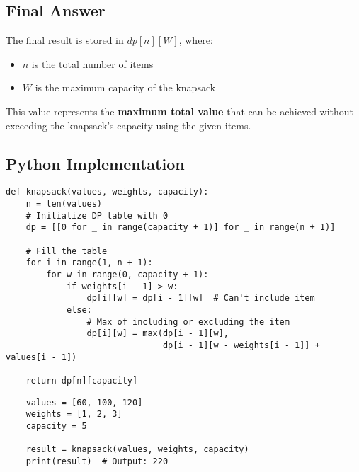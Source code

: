 \documentclass[14pt]{extarticle}
\begin{document}
\subsection*{Final Answer}

The final result is stored in $dp[n][W]$, where:
\begin{itemize}
    \item $n$ is the total number of items
    \item $W$ is the maximum capacity of the knapsack
\end{itemize}

This value represents the \textbf{maximum total value} that can be achieved without exceeding the 
knapsack's capacity using the given items.

\newpage
\subsection{Python Implementation}
\begin{lstlisting}[style=python, caption={0/1 Knapsack in Python}]
def knapsack(values, weights, capacity):
    n = len(values)
    # Initialize DP table with 0
    dp = [[0 for _ in range(capacity + 1)] for _ in range(n + 1)]

    # Fill the table
    for i in range(1, n + 1):
        for w in range(0, capacity + 1):
            if weights[i - 1] > w:
                dp[i][w] = dp[i - 1][w]  # Can't include item
            else:
                # Max of including or excluding the item
                dp[i][w] = max(dp[i - 1][w],
                               dp[i - 1][w - weights[i - 1]] + values[i - 1])

    return dp[n][capacity]
\end{lstlisting}

\begin{verbatim}
    values = [60, 100, 120]
    weights = [1, 2, 3]
    capacity = 5

    result = knapsack(values, weights, capacity)
    print(result)  # Output: 220
\end{verbatim}

\newpage
\end{document}
